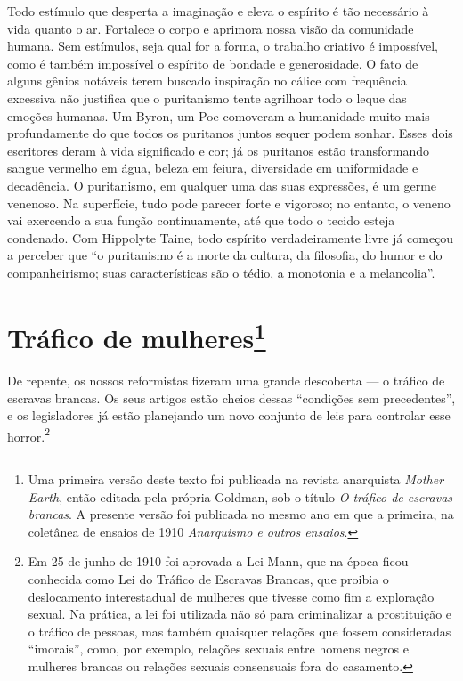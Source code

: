 Todo estímulo que desperta a imaginação e eleva o espírito é tão
necessário à vida quanto o ar. Fortalece o corpo e aprimora nossa visão
da comunidade humana. Sem estímulos, seja qual for a forma, o trabalho
criativo é impossível, como é também impossível o espírito de bondade e
generosidade. O fato de alguns gênios notáveis terem buscado inspiração
no cálice com frequência excessiva não justifica que o puritanismo
tente agrilhoar todo o leque das emoções humanas. Um Byron, um Poe
comoveram a humanidade muito mais profundamente do que todos os
puritanos juntos sequer podem sonhar. Esses dois escritores deram à vida
significado e cor; já os puritanos estão transformando sangue vermelho
em água, beleza em feiura, diversidade em uniformidade e decadência. O
puritanismo, em qualquer uma das suas expressões, é um germe venenoso.
Na superfície, tudo pode parecer forte e vigoroso; no entanto, o veneno
vai exercendo a sua função continuamente, até que todo o tecido esteja
condenado. Com Hippolyte Taine, todo espírito verdadeiramente livre já
começou a perceber que ``o puritanismo é a morte da cultura, da
filosofia, do humor e do companheirismo; suas características são o
tédio, a monotonia e a melancolia''.

\chapter{Tráfico de mulheres\footnote{Uma primeira versão deste texto foi
  publicada na revista anarquista \emph{Mother Earth}, então editada
  pela própria Goldman, sob o título \emph{O tráfico de escravas
  brancas}. A presente versão foi publicada no mesmo ano em que a
  primeira, na coletânea de ensaios de 1910 \emph{Anarquismo e outros
  ensaios}.}}

De repente, os nossos reformistas fizeram uma grande descoberta --- o
tráfico de escravas brancas. Os seus artigos estão cheios dessas
``condições sem precedentes'', e os legisladores já estão planejando um
novo conjunto de leis para controlar esse horror.\footnote{Em 25 de
  junho de 1910 foi aprovada a Lei Mann, que na época ficou conhecida
  como Lei do Tráfico de Escravas Brancas, que proibia o deslocamento
  interestadual de mulheres que tivesse como fim a exploração sexual. Na
  prática, a lei foi utilizada não só para criminalizar a prostituição e
  o tráfico de pessoas, mas também quaisquer relações que fossem
  consideradas ``imorais'', como, por exemplo, relações sexuais entre
  homens negros e mulheres brancas ou relações sexuais consensuais fora
  do casamento.}


